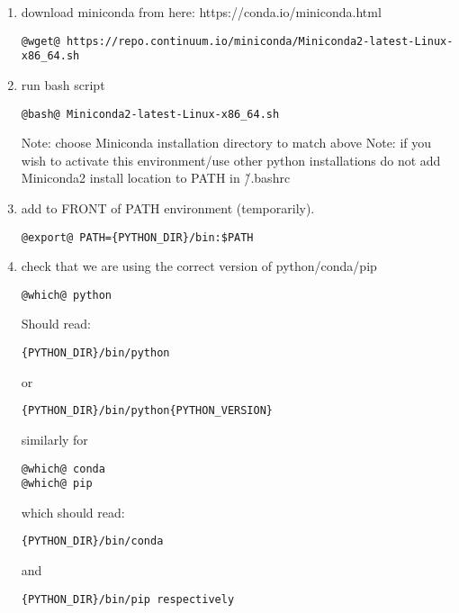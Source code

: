 \begin{enumerate}
\item  download miniconda from here: https://conda.io/miniconda.html
\begin{lstlisting}[style=bashstyle]
@wget@ https://repo.continuum.io/miniconda/Miniconda2-latest-Linux-x86_64.sh
\end{lstlisting}


\item  run bash script
\begin{lstlisting}[style=bashstyle]
@bash@ Miniconda2-latest-Linux-x86_64.sh
\end{lstlisting}


\noindent Note: choose Miniconda installation directory to match  above
\noindent Note: if you wish to activate this environment/use other python installations do not add Miniconda2 install location to PATH in \~/.bashrc
          
\item  add  to FRONT of PATH environment (temporarily).
\begin{lstlisting}[style=bashstyle]
@export@ PATH={PYTHON_DIR}/bin:$PATH
\end{lstlisting}



\item  check that we are using the correct version of python/conda/pip
\begin{lstlisting}[style=bashstyle]
@which@ python
\end{lstlisting}


      
Should read: 
\begin{lstlisting}[style=bashstyle]
{PYTHON_DIR}/bin/python 
\end{lstlisting}


\noindent or 
\begin{lstlisting}[style=bashstyle]
{PYTHON_DIR}/bin/python{PYTHON_VERSION} 
\end{lstlisting}


\noindent similarly for
\begin{lstlisting}[style=bashstyle]
@which@ conda
@which@ pip
\end{lstlisting}

\noindent which should read:
\begin{lstlisting}[style=bashstyle]
{PYTHON_DIR}/bin/conda  
\end{lstlisting}

\noindent and 
\begin{lstlisting}[style=bashstyle]
{PYTHON_DIR}/bin/pip respectively
\end{lstlisting}

\end{enumerate}



